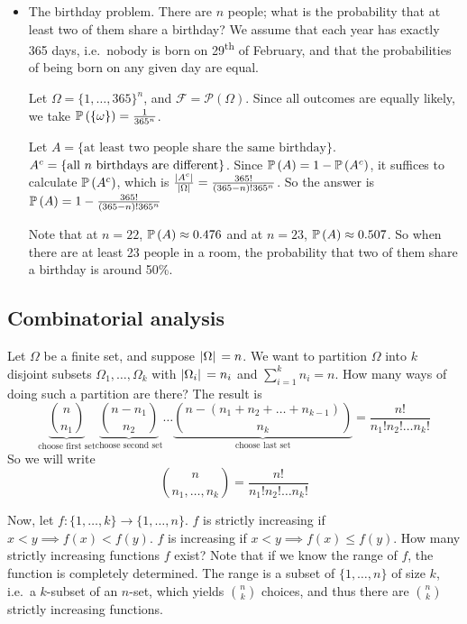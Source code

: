 \begin{itemize}
	\item The birthday problem.
	      There are \(n\) people; what is the probability that at least two of them share a birthday?
	      We assume that each year has exactly 365 days, i.e.\ nobody is born on 29\textsuperscript{th} of February, and that the probabilities of being born on any given day are equal.

	      Let \(\Omega = \{1, \dots, 365\}^n\), and \(\mathcal F = \mathcal P(\Omega)\).
	      Since all outcomes are equally likely, we take \(\mathbb{P}\left({\{\omega\}}\right) = \frac{1}{365^n}\).

	      Let \(A = \{ \text{at least two people share the same birthday} \}\).
	      \({A}^c = \{ \text{all } n \text{ birthdays are different} \}\).
	      Since \(\mathbb{P}\left({A}\right) = 1 - \mathbb{P}\left({{A}^c}\right)\), it suffices to calculate \(\mathbb{P}\left({{A}^c}\right)\), which is \(\frac{\abs*{{A}^c}}{\abs*{\Omega}} = \frac{365!}{(365 - n)!365^n}\).
	      So the answer is \(\mathbb{P}\left({A}\right) = 1 - \frac{365!}{(365 - n)!365^n}\)

	      Note that at \(n=22\), \(\mathbb{P}\left({A}\right) \approx 0.476\) and at \(n=23\), \(\mathbb{P}\left({A}\right) \approx 0.507\).
	      So when there are at least 23 people in a room, the probability that two of them share a birthday is around 50\%.
\end{itemize}

\subsection{Combinatorial analysis}
Let \(\Omega\) be a finite set, and suppose \(\abs*{\Omega} = n\).
We want to partition \(\Omega\) into \(k\) disjoint subsets \(\Omega_1, \dots, \Omega_k\) with \(\abs*{\Omega_i} = n_i\) and \(\sum_{i=1}^k n_i = n\).
How many ways of doing such a partition are there?
The result is
\[
	\underbrace{\binom{n}{n_1}}_{\text{choose first set}}\underbrace{\binom{n-n_1}{n_2}}_{\text{choose second set}}\dots\underbrace{\binom{n-(n_1 + n_2 + \dots + n_{k-1})}{n_k}}_{\text{choose last set}} = \frac{n!}{n_1!n_2!\dots n_k!}
\]
So we will write
\[
	\binom{n}{n_1, \dots, n_k} = \frac{n!}{n_1!n_2!\dots n_k!}
\]

Now, let \(f\colon \{1, \dots, k\} \to \{1, \dots, n\}\).
\(f\) is strictly increasing if \(x < y \implies f(x) < f(y)\).
\(f\) is increasing if \(x < y \implies f(x) \leq f(y)\).
How many strictly increasing functions \(f\) exist?
Note that if we know the range of \(f\), the function is completely determined.
The range is a subset of \(\{1, \dots, n\}\) of size \(k\), i.e.\ a \(k\)-subset of an \(n\)-set, which yields \(\binom{n}{k}\) choices, and thus there are \(\binom{n}{k}\) strictly increasing functions.

